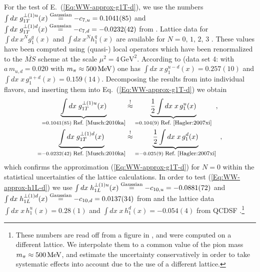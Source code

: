 \documentclass[a4paper,11pt]{article}
\newcommand{\ba}{\begin{eqnarray}}
\newcommand{\ea}{\end{eqnarray}}
\begin{document}
For the test of E.~(\ref{Eq:WW-approx-g1T-d}), we use the numbers
$\int d x\;g_{1T}^{\perp(1)u}(x)\stackrel{\text{\scriptsize Gaussian}}{=}
-c_{7,u}= 0.1041(85)$ and
$\int d x\;g_{1T}^{\perp(1)d}(x)\stackrel{\text{\scriptsize Gaussian}}{=}
-c_{7,d}=-0.0232(42)$
from \cite{Musch:2010ka}. %
Lattice data for
$\int d x \,x^{N}g_1^q(x)$
\cite{Hagler:2003is,Hagler:2007xi} and
$\int d x \,x^{N}h_1^q(x)$
\cite{Gockeler:2005cj} are available for $N=0,\,1,\,2,\,3$ .
These values have been computed using (quasi-) local operators which
have been renormalized to the $\overline{MS}$ scheme at the scale
$\mu^2 = 4\,\text{GeV}^2$.
According to \cite{Hagler:2007xi} (data set 4:
with $a\,m_{u,d} = 0.020$ with $m_\pi\approx 500\,{\rm MeV}$)
one has $\int d x \;x\,g_1^{u-d}(x)= 0.257(10)$ and
$\int d x \;x\,g_1^{u+d}(x)= 0.159(14)$.
Decomposing the results from  \cite{Hagler:2007xi} into
individual flavors, and inserting them into
Eq.~(\ref{Eq:WW-approx-g1T-d}) we obtain
\ba
        \underbrace{\int d x\;g_{1T}^{\perp(1)u}(x)}
        _{= 0.1041(85) \;\mbox{\footnotesize Ref.~\cite{Musch:2010ka}}}
        &\stackrel{!}{\approx}
        \underbrace{\frac{1}{2}\int d x\;x\,g_1^u(x)}
        _{= 0.104(9) \;\mbox{\footnotesize Ref.~\cite{Hagler:2007xi}}}
        \hspace{2mm} , \nonumber \\
        \underbrace{\int d x\;g_{1T}^{\perp(1)d}(x)}
        _{= -0.0232(42) \;\mbox{\footnotesize Ref.~\cite{Musch:2010ka}}}
        &\stackrel{!}{\approx}
        \underbrace{\frac{1}{2}\int d x\;x\,g_1^d(x)}
        _{= -0.025(9) \;\mbox{\footnotesize Ref.~\cite{Hagler:2007xi}}}
        \hspace{2mm},
        \label{Eq:test-WW-type-lattice-g1T}
\ea
which confirms the approximation (\ref{Eq:WW-approx-g1T-d}) for $N=0$
within the statistical uncertainties of the lattice calculations.
%
In order to test (\ref{Eq:WW-approx-h1L-d}) we use
$\int dx\;h_{1L}^{\perp(1)u}(x)\stackrel{\text{\scriptsize Gaussian}}{=}
-c_{10,u}=-0.0881(72)$
and
$\int dx\;h_{1L}^{\perp(1)d}(x)\stackrel{\text{\scriptsize Gaussian}}{=}
-c_{10,d}=0.0137(34)$
from \cite{Musch:2010ka} and the lattice data
$\int d x \;x\,h_1^u(x)= 0.28(1)$ and
$\int d x \;x\,h_1^d(x)= -0.054(4)$
from QCDSF \cite{Gockeler:2005cj}.\footnote{
  These numbers are read off from a figure in \cite{Gockeler:2005cj},
  and were computed on a different lattice. We interpolate them to a
  common value of the pion mass $m_\pi\approx500\,{\rm MeV}$, and
  estimate the uncertainty conservatively in order to take systematic effects
  into account due to the use of a different lattice.}
\end{document}
